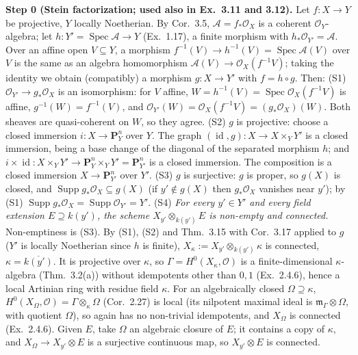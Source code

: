 \documentclass[11pt]{article}
\begin{document}
\textbf{Step 0 (Stein factorization; used also in Ex.~3.11 and 3.12).} Let $f:X\to Y$ be projective, $Y$ locally Noetherian. By Cor.~3.5, $\mathcal A=f_*\mathcal O_X$ is a coherent $\mathcal O_Y$-algebra; let $h:Y'=\operatorname{Spec}\mathcal A\to Y$ (Ex.~1.17), a finite morphism with $h_*\mathcal O_{Y'}=\mathcal A$. Over an affine open $V\subseteq Y$, a morphism $f^{-1}(V)\to h^{-1}(V)=\operatorname{Spec}\mathcal A(V)$ over $V$ is the same as an algebra homomorphism $\mathcal A(V)\to\mathcal O_X(f^{-1}V)$; taking the identity we obtain (compatibly) a morphism $g:X\to Y'$ with $f=h\circ g$. Then:
(S1) $\mathcal O_{Y'}\to g_*\mathcal O_X$ is an isomorphism: for $V$ affine, $W=h^{-1}(V)=\operatorname{Spec}\mathcal O_X(f^{-1}V)$ is affine, $g^{-1}(W)=f^{-1}(V)$, and $\mathcal O_{Y'}(W)=\mathcal O_X(f^{-1}V)=(g_*\mathcal O_X)(W)$. Both sheaves are quasi-coherent on $W$, so they agree.
(S2) $g$ is projective: choose a closed immersion $i:X\to\mathbf P^n_Y$ over $Y$. The graph $(\operatorname{id},g):X\to X\times_YY'$ is a closed immersion, being a base change of the diagonal of the separated morphism $h$; and $i\times\operatorname{id}:X\times_YY'\to\mathbf P^n_Y\times_YY'=\mathbf P^n_{Y'}$ is a closed immersion. The composition is a closed immersion $X\to\mathbf P^n_{Y'}$ over $Y'$.
(S3) $g$ is surjective: $g$ is proper, so $g(X)$ is closed, and $\operatorname{Supp}g_*\mathcal O_X\subseteq g(X)$ (if $y'\notin g(X)$ then $g_*\mathcal O_X$ vanishes near $y'$); by (S1) $\operatorname{Supp}g_*\mathcal O_X=\operatorname{Supp}\mathcal O_{Y'}=Y'$.
(S4) \emph{For every $y'\in Y'$ and every field extension $E\supseteq k(y')$, the scheme $X_{y'}\otimes_{k(y')}E$ is non-empty and connected.} Non-emptiness is (S3). By (S1), (S2) and Thm.~3.15 with Cor.~3.17 applied to $g$ ($Y'$ is locally Noetherian since $h$ is finite), $X_\kappa:=X_{y'}\otimes_{k(y')}\kappa$ is connected, $\kappa=\overline{k(y')}$. It is projective over $\kappa$, so $\Gamma=H^0(X_\kappa,\mathcal O)$ is a finite-dimensional $\kappa$-algebra (Thm.~3.2(a)) without idempotents other than $0,1$ (Ex.~2.4.6), hence a local Artinian ring with residue field $\kappa$. For an algebraically closed $\Omega\supseteq\kappa$, $H^0(X_\Omega,\mathcal O)=\Gamma\otimes_\kappa\Omega$ (Cor.~2.27) is local (its nilpotent maximal ideal is $\mathfrak m_\Gamma\otimes\Omega$, with quotient $\Omega$), so again has no non-trivial idempotents, and $X_\Omega$ is connected (Ex.~2.4.6). Given $E$, take $\Omega$ an algebraic closure of $E$; it contains a copy of $\kappa$, and $X_\Omega\to X_{y'}\otimes E$ is a surjective continuous map, so $X_{y'}\otimes E$ is connected.
\end{document}

